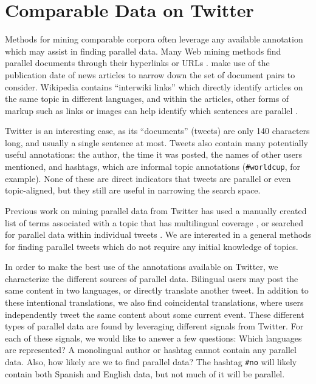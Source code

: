 \chapter{Comparable Data on Twitter}
\label{chap:twitter}

Methods for mining comparable corpora often leverage any available annotation
which may assist in finding parallel data. 
Many Web mining methods find parallel documents through their hyperlinks or
URLs \citep{Nie99,Chen00,Resnik99,Resnik03,Smith13}. \citet{Munteanu05} make use of the
publication date of news articles to narrow down the set of document pairs to
consider. Wikipedia contains ``interwiki links'' which directly identify
articles on the same topic in different languages, and within the articles,
other forms of markup such as links or images can help identify which
sentences are parallel \citep{Smith10}.

Twitter is an interesting case, as its ``documents'' (tweets) are only 140 characters
long, and usually a single sentence at most. Tweets also contain many
potentially useful annotations: the author, the time it was posted, the names of
other users mentioned, and hashtags, which are informal topic annotations
({\tt \#worldcup}, for example). None of these are direct indicators that tweets
are parallel or even topic-aligned, but they still are useful in narrowing
the search space. 

Previous work on mining parallel data from Twitter has used a
manually created list of terms associated with a topic that has multilingual
coverage \citep{Jehl12}, or searched for parallel
data within individual tweets \citep{Ling13}. We are interested in a general
methods for finding parallel tweets which do not require any initial knowledge
of topics.

In order to make the best use of the annotations available on Twitter, we
characterize the different sources of parallel data. Bilingual users may post
the same content in two languages, or directly translate another tweet. In
addition to these intentional translations, we also find coincidental
translations, where users independently tweet the same content about some
current event. These different types of parallel data are found by leveraging
different signals from Twitter. For each of these signals, we would like to
answer a few questions: Which languages are represented? A monolingual author or
hashtag cannot contain any parallel data. Also, how likely are we to
find parallel data? The hashtag {\tt \#no} will likely contain both Spanish and
English data, but not much of it will be parallel.

